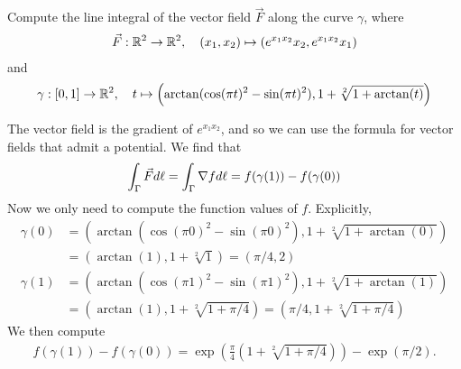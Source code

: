 \documentclass[11pt]{article}
\begin{document}
\begin{exercise}
    Compute the line integral of the vector field $\vec{F}$ along the curve $\gamma$, where 
    \begin{align*}
        \vec F : \mathbb{R}^2 \to \mathbb{R}^2, \quad (x_1,x_2) \mapsto ( e^{ x_1x_2 } x_2, e^{ x_1 x_2 } x_1 )
    \end{align*}
    and 
    \begin{align*}
        \gamma : [0,1] \to \mathbb{R}^2, \quad t \mapsto \left( \arctan( \cos(\pi t)^2 - \sin(\pi t)^2 ), 1 + \sqrt[2]{1+\arctan(t)} \right)
    \end{align*}
\end{exercise}
\begin{solution}
    The vector field is the gradient of $e^{ x_1 x_2 }$, and so we can use the formula for vector fields that admit a potential.
    We find that
    \begin{align*}
        \int_\Gamma \vec F d\ell = \int_\Gamma \nabla f d\ell = f(\gamma(1)) - f(\gamma(0))
    \end{align*}
    Now we only need to compute the function values of $f$. Explicitly,
    \begin{align*}
        \gamma(0) 
		&= 
		\left( \arctan( \cos(\pi 0)^2 - \sin(\pi 0)^2 ), 1 + \sqrt[2]{1+\arctan(0)} \right)
        \\&
		=
        \left( \arctan( 1 ), 1 + \sqrt[2]{1} \right) 
        =
        \left( \pi/4, 2 \right)
    \end{align*}
    \begin{align*}
        \gamma(1) 
		&= 
		\left( \arctan( \cos(\pi 1)^2 - \sin(\pi 1)^2 ), 1 + \sqrt[2]{1+\arctan(1)} \right)
        \\&
		=
        \left( \arctan( 1 ), 1 + \sqrt[2]{1+\pi/4} \right)
        =
        \left( \pi/4, 1 + \sqrt[2]{1+\pi/4} \right)
    \end{align*}
    We then compute
    \begin{align*}
        f(\gamma(1)) - f(\gamma(0)) 
        =
        \exp\left( \frac \pi 4 ( 1 + \sqrt[2]{1+\pi/4} ) \right) - \exp\left( \pi/2 \right).
    \end{align*}
\end{solution}
\end{document}
